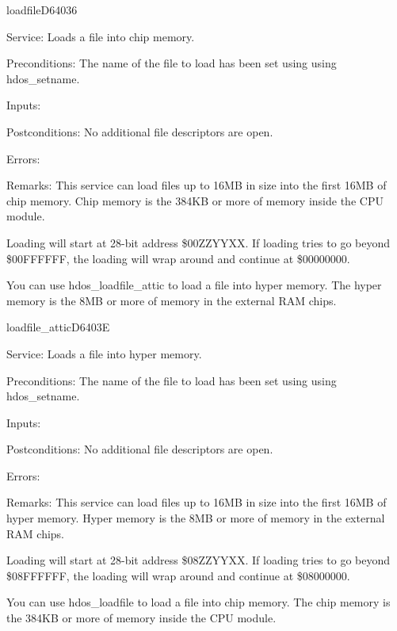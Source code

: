 \newpage
\begin{hyppotrap}{loadfile}{D640}{36}
\item [Service:]
  Loads a file into chip memory.
\item [Preconditions:]
  The name of the file to load has been set using using hdos\_setname.
\item [Inputs:]
\item [Postconditions:]
  No additional file descriptors are open.
\item [Errors:]
\item [Remarks:]
  This service can load files up to 16MB in size into the first 16MB of chip
  memory. Chip memory is the 384KB or more of memory inside the CPU module.

  Loading will start at 28-bit address \$00ZZYYXX. If loading tries to go beyond
  \$00FFFFFF, the loading will wrap around and continue at \$00000000.

  You can use hdos\_loadfile\_attic to load a file into hyper memory. The hyper
  memory is the 8MB or more of memory in the external RAM chips.
\end{hyppotrap}


\newpage
\begin{hyppotrap}{loadfile\_attic}{D640}{3E}
\item [Service:]
  Loads a file into hyper memory.
\item [Preconditions:]
  The name of the file to load has been set using using hdos\_setname.
\item [Inputs:]
\item [Postconditions:]
  No additional file descriptors are open.
\item [Errors:]
\item [Remarks:]
  This service can load files up to 16MB in size into the first 16MB of hyper
  memory. Hyper memory is the 8MB or more of memory in the external RAM chips.

  Loading will start at 28-bit address \$08ZZYYXX. If loading tries to go beyond
  \$08FFFFFF, the loading will wrap around and continue at \$08000000.

  You can use hdos\_loadfile to load a file into chip memory. The chip memory is
  the 384KB or more of memory inside the CPU module.
\end{hyppotrap}


